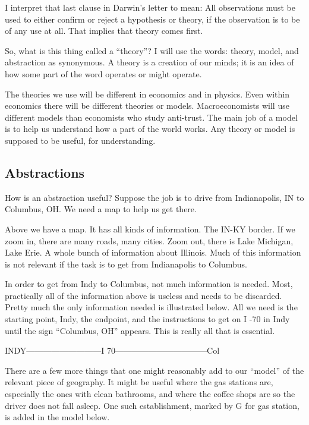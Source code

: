 \documentclass[
]{book}
\begin{document}
I interpret that last clause in Darwin's letter to mean: All observations must be used to either confirm or reject a hypothesis or theory, if the observation is to be of any use at all. That implies that theory comes first.

So, what is this thing called a ``theory''? I will use the words: theory, model, and abstraction as synonymous. A theory is a creation of our minds; it is an idea of how some part of the word operates or might operate.

The theories we use will be different in economics and in physics. Even within economics there will be different theories or models. Macroeconomists will use different models than economists who study anti-trust. The main job of a model is to help us understand how a part of the world works. Any theory or model is supposed to be useful, for understanding.

\hypertarget{abstractions}{%
\subsection{Abstractions}\label{abstractions}}

How is an abstraction useful? Suppose the job is to drive from Indianapolis, IN to Columbus, OH. We need a map to help us get there.

\newpage{}

Above we have a map. It has all kinds of information. The IN-KY border. If we zoom in, there are many roads, many cities. Zoom out, there is Lake Michigan, Lake Erie. A whole bunch of information about Illinois. Much of this information is not relevant if the task is to get from Indianapolis to Columbus.

In order to get from Indy to Columbus, not much information is needed. Most, practically all of the information above is useless and needs to be discarded. Pretty much the only information needed is illustrated below. All we need is the starting point, Indy, the endpoint, and the instructions to get on I -70 in Indy until the sign ``Columbus, OH'' appears. This is really all that is essential.

INDY---------------------------I 70---------------------------------Col

There are a few more things that one might reasonably add to our ``model'' of the relevant piece of geography. It might be useful where the gas stations are, especially the ones with clean bathrooms, and where the coffee shops are so the driver does not fall asleep. One such establishment, marked by G for gas station, is added in the model below.
\end{document}
